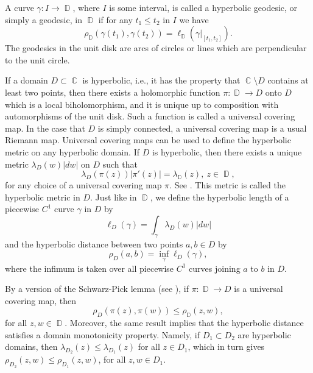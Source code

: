 \documentclass[11pt, letterpaper,leqno]{amsart}
\numberwithin{equation}{section}
\theoremstyle{definition}
\DeclareMathOperator{\D}{\mathbb{D}}
\DeclareMathOperator{\C}{\mathbb{C}}
\begin{document}
A curve $\gamma: I\to\D$, where $I$ is some interval, is called a hyperbolic geodesic, or simply a geodesic, in $\D$ if for any $t_1\leq t_2$ in $I$ we have
\[
\rho_{\D}(\gamma(t_1),\gamma(t_2))=\ell_{\D}(\gamma\vert_{[t_1,t_2]}).
\]
The  geodesics in the unit disk are arcs of circles or lines which are perpendicular to the unit circle. 

If a domain $D\subset\C$ is hyperbolic, i.e., it has the property that $\C\setminus D$ contains at least two points, then there exists a holomorphic function $\pi:\D\to D$ onto $D$ which is a local biholomorphism, and it is unique up to composition with automorphisms of the unit disk. Such a function is called a universal covering map. In the case that $D$ is simply connected, a universal covering map is a usual Riemann map. Universal covering maps can be used to define the hyperbolic metric on any hyperbolic domain. If $D$ is hyperbolic, then there exists a unique metric $\lambda_D(w)|dw|$ on $D$ such that
\begin{equation}\label{density}
\lambda_D(\pi(z))|\pi'(z)|=\lambda_{\D}(z),\ z\in\D,
\end{equation}
for any choice of a universal covering map $\pi$. See \cite[Theorem 10.3]{BM}. This metric is called the hyperbolic metric in $D$. Just like in $\D$, we define the hyperbolic length of a piecewise $C^1$ curve $\gamma$ in $D$ by
\begin{equation}\label{length2}
\ell_D(\gamma)=\int_{\gamma}\lambda_D(w)|dw|
\end{equation}
and the hyperbolic distance between two points $a,b\in D$ by 
\begin{equation}\label{hdmultiply}
	\rho_D(a,b)=\inf_{\gamma}\ell_D(\gamma),
\end{equation}
where the infimum is taken over all piecewise $C^1$ curves joining $a$ to $b$ in $D$.

By a version of the Schwarz-Pick lemma (see \cite[Theorem 10.5]{BM}), if $\pi:\D\to D$ is a universal covering map, then
\begin{equation}\label{contraction}
	\rho_D(\pi(z),\pi(w))\leq \rho_{\D}(z,w), 
\end{equation}
for all $z,w\in\D$. Moreover, the same result implies that the hyperbolic distance satisfies a domain monotonicity property. Namely, if $D_1\subset D_2$ are hyperbolic domains, then $\lambda_{D_2}(z)\leq \lambda_{D_1}(z)$ for all $z\in D_1$, which in turn gives $\rho_{D_2}(z,w)\leq \rho_{D_1}(z,w)$, for all $z,w\in D_1$.
\end{document}

